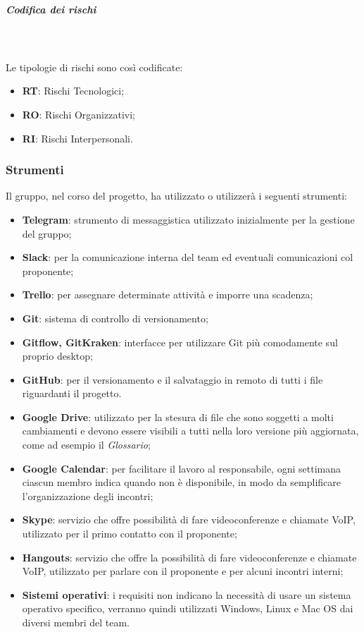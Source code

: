 			\noindent
			\subparagraph{Codifica dei rischi} \mbox{}\\ \mbox{}\\
				Le tipologie di rischi sono così codificate:
				\begin{itemize}
					\item \textbf{RT}: Rischi Tecnologici;
					\item \textbf{RO}: Rischi Organizzativi;
					\item \textbf{RI}: Rischi Interpersonali.
				\end{itemize}

		\subsubsection{Strumenti}
		Il gruppo, nel corso del progetto, ha utilizzato o utilizzerà i seguenti strumenti:
		\begin{itemize}
			\item \textbf{Telegram\glo}: strumento di messaggistica utilizzato inizialmente per la gestione del gruppo;
			\item \textbf{Slack\glo}: per la comunicazione interna del team ed eventuali comunicazioni col proponente;
			\item \textbf{Trello}: per assegnare determinate attività e imporre una scadenza;
			\item \textbf{Git}: sistema di controllo di versionamento;
			\item \textbf{Gitflow, GitKraken}: interfacce per utilizzare Git più comodamente sul proprio desktop;
			\item \textbf{GitHub}: per il versionamento e il salvataggio in remoto di tutti i file riguardanti il progetto.
			\item \textbf{Google Drive}: utilizzato per la stesura di file che sono soggetti a molti cambiamenti e devono essere visibili a tutti nella loro versione più aggiornata, come ad esempio il \textit{Glossario};
			\item \textbf{Google Calendar}: per facilitare il lavoro al responsabile, ogni settimana ciascun membro indica quando non è disponibile, in modo da semplificare l'organizzazione degli incontri;
			\item \textbf{Skype}: servizio che offre possibilità di fare videoconferenze e chiamate VoIP, utilizzato per il primo contatto con il proponente;
			\item \textbf{Hangouts}: servizio che offre la possibilità di fare videoconferenze e chiamate VoIP, utilizzato per parlare con il proponente e per alcuni incontri interni;
			\item \textbf{Sistemi operativi}: i requisiti non indicano la necessità di usare un sistema operativo specifico, verranno quindi utilizzati Windows, Linux e Mac OS dai diversi membri del team. %
		\end{itemize}
